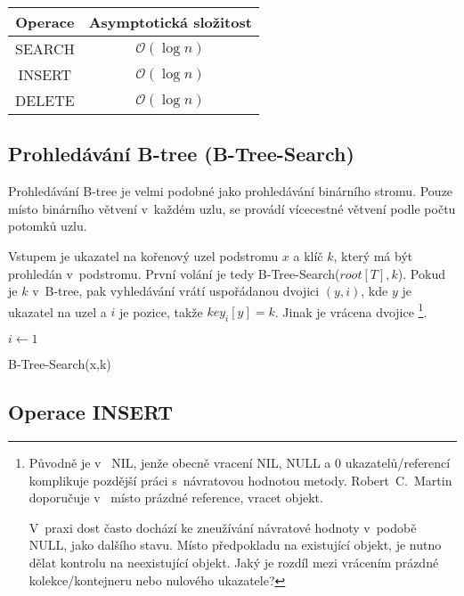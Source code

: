 \begin{tabular}{|c|c|}
\hline 
Operace & Asymptotická složitost\tabularnewline
\hline 
\hline 
SEARCH & $\mathcal{O}(\log n)$\tabularnewline
\hline 
INSERT & $\mathcal{O}(\log n)$\tabularnewline
\hline 
DELETE & $\mathcal{O}(\log n)$\tabularnewline
\hline 
\end{tabular}


\subsection{Prohledávání B-tree (B-Tree-Search)}

Prohledávání B-tree je velmi podobné jako prohledávání binárního stromu\@.
Pouze místo binárního větvení v~každém uzlu, se provádí vícecestné
větvení podle počtu potomků uzlu\@.

Vstupem je ukazatel na kořenový uzel podstromu $x$ a klíč $k$, který
má být prohledán v~podstromu\@. První volání je tedy B-Tree-Search($root[T],k$).
Pokud je $k$ v~B-tree, pak vyhledávání vrátí uspořádanou dvojici
$(y,i)$, kde $y$ je ukazatel na uzel a $i$ je pozice, takže $key_{i}[y]=k$\@.
Jinak je vrácena  dvojice%
\footnote{Původně je v~\cite{Cormen:2001:IA:580470} NIL, jenže obecně vracení
NIL, NULL a 0 ukazatelů/referencí komplikuje pozdější práci s~návratovou
hodnotou metody. Robert~C.~Martin doporučuje v~ místo prázdné
reference, vracet  objekt.

V~praxi dost často dochází ke zneužívání návratové hodnoty v~podobě
NULL, jako dalšího stavu. Místo předpokladu na existující objekt,
je nutno dělat kontrolu na neexistující objekt. Jaký je rozdíl mezi
vrácením prázdné kolekce/kontejneru nebo nulového ukazatele?%
}\@.

\begin{algorithm}[t]
\SetAlgoLined
{}

$i \longleftarrow 1$

\caption{B-Tree-Search(x,k)}
\end{algorithm}



\subsection{Operace INSERT}

